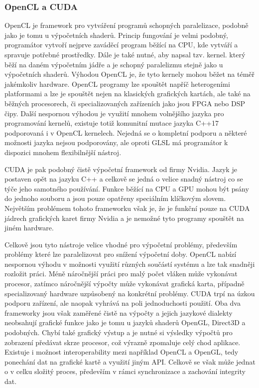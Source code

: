 \subsubsection{OpenCL a CUDA}
OpenCL je framework pro vytváření programů schopných paralelizace, podobně jako je tomu u výpočetních shaderů. Princip fungování je velmi podobný, programátor vytvoří nejprve zaváděcí program běžící na CPU, kde vytváří a spravuje potřebné prostředky. Dále je také nutné, aby napsal tzv. kernel. který běží na daném výpočetním jádře a je schopný paralelizmu stejně jako u výpočetních shaderů. Výhodou OpenCL je, že tyto kernely mohou běžet na téměř jakémkoliv hardware. OpenCL programy lze spouštět napříč heterogeními platformami a lze je spouštět nejen na klasických grafických kartách, ale také na běžných procesorech, či specializovaných zařízeních jako jsou FPGA nebo DSP čipy. Další nespornou výhodou je využití mnohem volnějšího jazyka pro programování kernelů, existuje totiž komunitní mutace jazyka C++17 podporovaná i v OpenCL kernelech. Nejedná se o kompletní podporu a některé možnosti jazyka nejsou podporovány, ale oproti GLSL má programátor k dispozici mnohem flexibilnější nástroj. \cite{opencl}

CUDA je pak podobný čistě výpočetní framework od firmy Nvidia. Jazyk je postaven opět na jazyku C++ a celkově se jedná o velice snadný nástroj co se týče jeho samotného používání. Funkce běžící na CPU a GPU mohou být psány do jednoho souboru a jsou pouze opatřeny speciálním klíčkovým slovem. Největším problémem tohoto frameworku však je, že je funkční pouze na CUDA jádrech grafických karet firmy Nvidia a je nemožné tyto programy spouštět na jiném hardware. \cite{nvidia_developer_2021} \cite{10_ebersole_2018}

Celkově jsou tyto nástroje velice vhodné pro výpočetní problémy, především problémy které lze paralelizovat pro snížení výpočetní doby. OpenCL nabízí nespornou výhodu v možnosti využití různých součástí systému a lze tak snadněji rozložit práci. Méně náročnější práci pro malý počet vláken může vykonávat procesor, zatímco náročnější výpočty může vykonávat grafická karta, případně specializovaný hardware uzpůsobený na konkrétní problémy. CUDA trpí na úzkou podporu zařízení, ale naopak vyhrává na poli jednoduchosti použití. Oba dva frameworky jsou však zaměřené čistě na výpočty a jejich jazykové dialekty neobsahují grafické funkce jako je tomu u jazyků shaderů OpenGL, Direct3D a podobných. Chybí také grafický výstup a je nutné si výsledky výpočtů pro zobrazení předávat skrze procesor, což výrazně zpomaluje celý chod aplikace. Existuje i možnost interoperability mezi například OpenCL a OpenGL, tedy ponechání dat na grafické kartě a využití jiným API. Celkově se však může jednat o v celku složitý proces, především v rámci synchronizace a zachování integrity dat.

